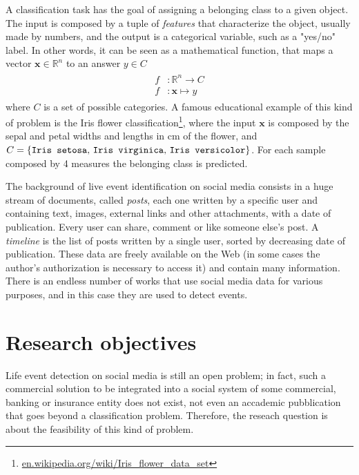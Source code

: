 A classification task has the goal of assigning a belonging class to a given object. The input is composed by a tuple of \emph{features} that characterize the object, usually made by numbers, and the output is a categorical variable, such as a "yes/no" label. In other words, it can be seen as a mathematical function, that maps a vector $ \boldsymbol{x} \in \mathbb{R}^n $ to an answer $ y \in C $
\begin{gather*}
\begin{split}
f & \colon \mathbb{R}^n \to C \\
f & \colon \boldsymbol{x} \mapsto y
\end{split}
\end{gather*}
where $C$ is a set of possible categories. A famous educational example of this kind of problem is the Iris flower classification\footnote{\url{en.wikipedia.org/wiki/Iris_flower_data_set}}, where the input $ \boldsymbol{x} $ is composed by the sepal and petal widths and lengths in cm of the flower, and $C = \{\text{\texttt{Iris setosa}, \texttt{Iris virginica}, \texttt{Iris versicolor}}\}$. For each sample composed by 4 measures the belonging class is predicted.

The background of live event identification on social media consists in a huge stream of documents, called \emph{posts}, each one written by a specific user and containing text, images, external links and other attachments, with a date of publication. Every user can share, comment or like someone else's post. A \emph{timeline} is the list of posts written by a single user, sorted by decreasing date of publication. These data are freely available on the Web (in some cases the author's authorization is necessary to access it) and contain many information. There is an endless number of works that use social media data for various purposes, and in this case they are used to detect events.

\section{Research objectives}
Life event detection on social media is still an open problem; in fact, such a commercial solution to be integrated into a social system of some commercial, banking or insurance entity does not exist, not even an accademic pubblication that goes beyond a classification problem. Therefore, the reseach question is about the feasibility of this kind of problem.

